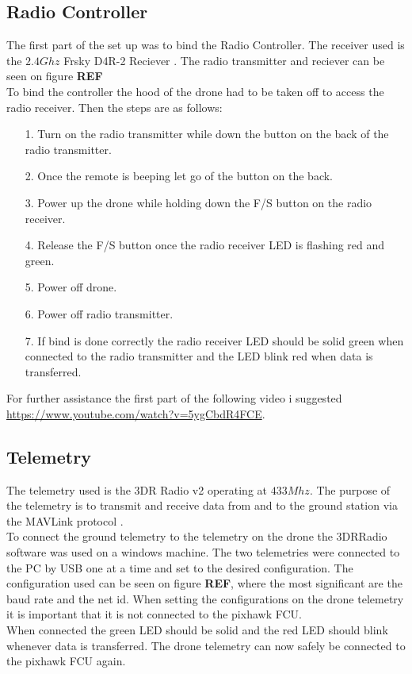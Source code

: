 \subsection*{Radio Controller}
The first part of the set up was to bind the Radio Controller. The receiver used is the $2.4 Ghz$ Frsky D4R-2 Reciever \cite{Ref:FrSky}. The radio transmitter and reciever can be seen on figure \textbf{REF}\\ 
To bind the controller the hood of the drone had to be taken off to access the radio receiver. Then the steps are as follows:
\begin{itemize}
\item[1.] Turn on the radio transmitter while down the button on the back of the radio transmitter.
\item[2.] Once the remote is beeping let go of the button on the back.
\item[3.] Power up the drone while holding down the F/S button on the radio receiver.
\item[4.] Release the F/S button once the radio receiver LED is flashing red and green.
\item[5.] Power off drone.
\item[6.] Power off radio transmitter.
\item[7.] If bind is done correctly the radio receiver LED should be solid green when connected to the radio transmitter and the LED blink red when data is transferred.
\end{itemize}
For further assistance the first part of the following video i suggested \url{https://www.youtube.com/watch?v=5ygCbdR4FCE}.

\subsection*{Telemetry}
The telemetry used is the 3DR Radio v2 \cite{Ref:Telem} operating at $433 Mhz$. The purpose of the telemetry is to transmit and receive data from and to the ground station via the MAVLink protocol \cite{Ref:MAVLink}.\\
To connect the ground telemetry to the telemetry on the drone the 3DRRadio software was used on a windows machine. The two telemetries were connected to the PC by USB one at a time and set to the desired configuration. The configuration used can be seen on figure \textbf{REF}, where the most significant are the baud rate and the net id. When setting the configurations on the drone telemetry it is important that it is not connected to the pixhawk FCU.\\
When connected the green LED should be solid and the red LED should blink whenever data is transferred. The drone telemetry can now safely be connected to the pixhawk FCU again.

